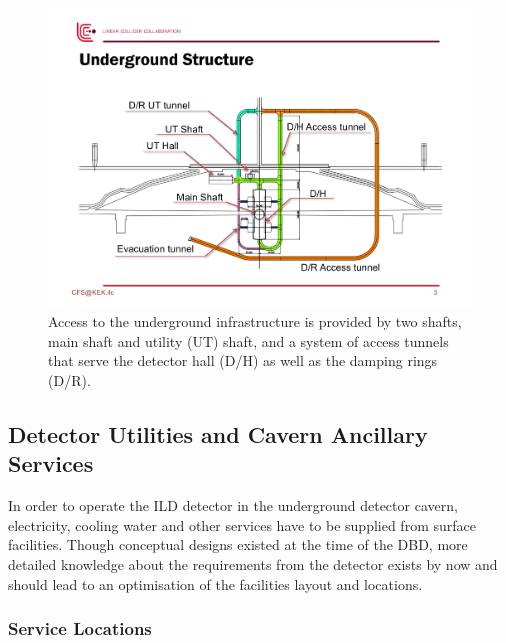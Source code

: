 \begin{figure}[h!]
\includegraphics[width=1.0\hsize]{Integration/fig/Access.pdf}
\caption{\label{fig:integration:access}Access to the underground infrastructure is provided by two shafts, main shaft and utility (UT) shaft, and a system of access tunnels~\cite{ild:bib:Access} that serve the detector hall (D/H) as well as the damping rings (D/R). }
\end{figure}

\subsection{Detector Utilities and Cavern Ancillary Services}


In order to operate the ILD detector in the underground detector cavern, electricity, cooling water and other services have to be supplied from surface facilities. Though conceptual designs existed at the time of the DBD, more detailed knowledge about the requirements from the detector exists by now and should lead to an optimisation of the facilities layout and locations.


\subsubsection{Service Locations}
\label{ild:sec:service_locations}

